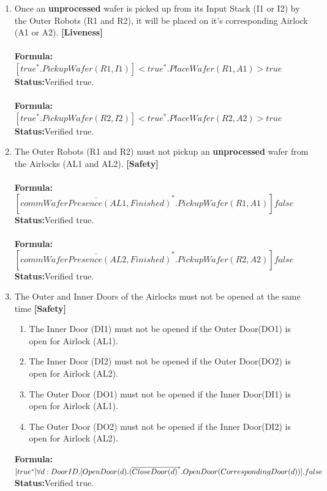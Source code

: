\documentclass[a4paper,12pt]{article}
\begin{document}
\begin{enumerate}
		\item Once an \textbf{unprocessed} wafer is picked up from its Input Stack (I1 or I2) by the Outer Robots (R1 and R2), it will be placed on it's corresponding Airlock (A1 or A2). \textbf{[Liveness]}
		\\
		\\\textbf{Formula:} $[true^*.PickupWafer(R1,I1)] <true^*.PlaceWafer(R1,A1)>true$ \\\textbf{Status:}Verified true.
		\\
		\\\textbf{Formula:} $[true^*.PickupWafer(R2,I2)] <true^*.PlaceWafer(R2,A2)>true$ \\\textbf{Status:}Verified true.
		
		
		\item The Outer Robots (R1 and R2) must not pickup an \textbf{unprocessed} wafer from the Airlocks (AL1 and AL2). \textbf{[Safety]}
		\\
		\\\textbf{Formula:} $[\overline{commWaferPresence(AL1,Finished)}^*.PickupWafer(R1,A1)]false $ \\\textbf{Status:}Verified true.
		\\
		\\\textbf{Formula:} $[\overline{commWaferPresence(AL2,Finished)}^*.PickupWafer(R2,A2)]false $ \\\textbf{Status:}Verified true.
		
		
		
		\item The Outer and Inner Doors of the Airlocks must not be opened at the same time \textbf{[Safety]}
		\begin{enumerate}
			\item The Inner Door (DI1) must not be opened if the Outer Door(DO1) is open for Airlock (AL1).
			
			\item The Inner Door (DI2) must not be opened if the Outer Door(DO2) is open for Airlock (AL2).
			
			\item The Outer Door (DO1) must not be opened if the Inner Door(DI1) is open for Airlock (AL1).
			
			\item The Outer Door (DO2) must not be opened if the Inner Door(DI2) is open for Airlock (AL2).
		\end{enumerate}
		
		\textbf{Formula:} $[true^*] \forall d: DoorID.[OpenDoor(d).
		\\(\overline{CloseDoor(d)}^*.OpenDoor(CorrespondingDoor(d))].false$ \\\textbf{Status:}Verified true.
		

\end{enumerate}
\end{document}
